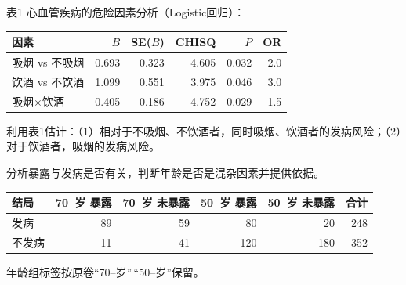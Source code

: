 \par\addvspace{8pt}\noindent\begin{minipage}{\linewidth}


表1 心血管疾病的危险因素分析（Logistic回归）：

\begin{center}\small\setlength{\tabcolsep}{4pt}\renewcommand{\arraystretch}{1.22}\begin{tabular}{@{}lrrrrr@{}}
\toprule
因素 & \(B\) & SE(\(B\)) & CHISQ & \(P\) & OR \\
\midrule

吸烟 vs 不吸烟 & 0.693 & 0.323 & 4.605 & 0.032 & 2.0 \\
饮酒 vs 不饮酒 & 1.099 & 0.551 & 3.975 & 0.046 & 3.0 \\
吸烟\(\times\)饮酒 & 0.405 & 0.186 & 4.752 & 0.029 & 1.5 \\
\bottomrule\end{tabular}\end{center}

利用表1估计：（1）相对于不吸烟、不饮酒者，同时吸烟、饮酒者的发病风险；（2）对于饮酒者，吸烟的发病风险。



\end{minipage}\par\vspace{5pt}

\par\addvspace{8pt}\noindent\begin{minipage}{\linewidth}


分析暴露与发病是否有关，判断年龄是否是混杂因素并提供依据。

\begin{center}\small\setlength{\tabcolsep}{4pt}\renewcommand{\arraystretch}{1.22}\begin{tabular}{@{}lrrrrr@{}}
\toprule
结局 & 70--岁 暴露 & 70--岁 未暴露 & 50--岁 暴露 & 50--岁 未暴露 & 合计 \\
\midrule

发病 & 89 & 59 & 80 & 20 & 248 \\
不发病 & 11 & 41 & 120 & 180 & 352 \\
\bottomrule\end{tabular}\end{center}

年龄组标签按原卷``70--岁''\,``50--岁''保留。



\end{minipage}\par\vspace{5pt}

